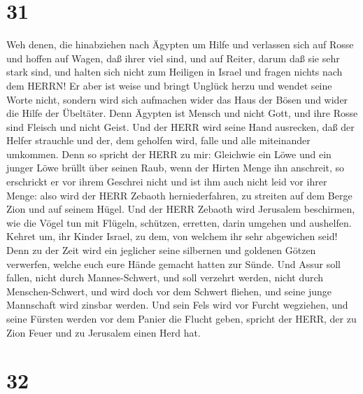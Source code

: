 \hypertarget{section-30}{%
\section{31}\label{section-30}}

 Weh denen, die hinabziehen nach Ägypten um Hilfe und
verlassen sich auf Rosse und hoffen auf Wagen, daß ihrer viel sind, und
auf Reiter, darum daß sie sehr stark sind, und halten sich nicht zum
Heiligen in Israel und fragen nichts nach dem HERRN!  Er
aber ist weise und bringt Unglück herzu und wendet seine Worte nicht,
sondern wird sich aufmachen wider das Haus der Bösen und wider die Hilfe
der Übeltäter.  Denn Ägypten ist Mensch und nicht Gott, und
ihre Rosse sind Fleisch und nicht Geist. Und der HERR wird seine Hand
ausrecken, daß der Helfer strauchle und der, dem geholfen wird, falle
und alle miteinander umkommen.  Denn so spricht der HERR zu
mir: Gleichwie ein Löwe und ein junger Löwe brüllt über seinen Raub,
wenn der Hirten Menge ihn anschreit, so erschrickt er vor ihrem Geschrei
nicht und ist ihm auch nicht leid vor ihrer Menge: also wird der HERR
Zebaoth herniederfahren, zu streiten auf dem Berge Zion und auf seinem
Hügel.  Und der HERR Zebaoth wird Jerusalem beschirmen, wie
die Vögel tun mit Flügeln, schützen, erretten, darin umgehen und
aushelfen.  Kehret um, ihr Kinder Israel, zu dem, von
welchem ihr sehr abgewichen seid!  Denn zu der Zeit wird ein
jeglicher seine silbernen und goldenen Götzen verwerfen, welche euch
eure Hände gemacht hatten zur Sünde.  Und Assur soll fallen,
nicht durch Mannes-Schwert, und soll verzehrt werden, nicht durch
Menschen-Schwert, und wird doch vor dem Schwert fliehen, und seine junge
Mannschaft wird zinsbar werden.  Und sein Fels wird vor
Furcht wegziehen, und seine Fürsten werden vor dem Panier die Flucht
geben, spricht der HERR, der zu Zion Feuer und zu Jerusalem einen Herd
hat.

\hypertarget{section-31}{%
\section{32}\label{section-31}}

